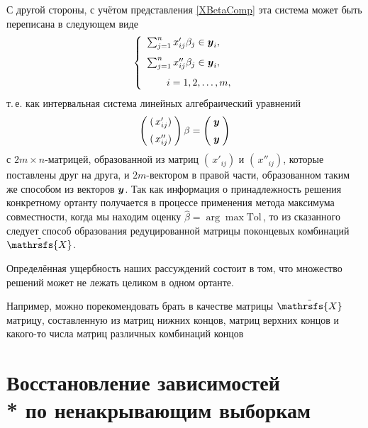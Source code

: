 \documentclass[a5paper,openany]{book}
\newcommand{\mbf}[1]{\protect\text{\boldmath$#1$}}
\newcommand{\Tol}{\mathrm{Tol}\,}
\newcommand{\calX}{\mathrsfs{X}}
\begin{document}
С другой стороны, с учётом представления \eqref{XBetaComp} эта система может быть 
переписана в следующем виде 
\begin{equation*} 
\left\{ 
\begin{array}{l}
\sum_{j=1}^n x'_{ij}\beta_{j}  \in\mbf{y}_{i}, \\[3mm] 
\sum_{j=1}^n x''_{ij}\beta_{j} \in\mbf{y}_{i}, \\[3mm] 
\qquad  i = 1,2,\ldots,m, 
\end{array} 
\right. 
\end{equation*} 
т.\,е. как интервальная система линейных алгебраический уравнений 
\begin{equation*} 
\left( 
\begin{array}{@{\;}c@{\;}} 
(\,x'_{ij}) \\[2mm] 
(\,x''_{ij}) 
\end{array}
\right) \beta = 
\left( 
\begin{array}{@{\;}c@{\;}} 
\mbf{y} \\[2mm] \mbf{y} 
\end{array} 
\right)
\end{equation*} 
с $2m\times n$-матрицей, образованной из матриц $(\,x'_{ij})$ и $(\,x''_{ij})$, 
которые поставлены друг на друга, и $2m$-вектором в правой части, образованном 
таким же способом из векторов $\mbf{y}$. Так как информация о принадлежность решения 
конкретному ортанту получается в процессе применения метода максимума совместности, 
когда мы находим оценку $\hat{\beta} = \arg\max \Tol$, то из сказанного следует способ 
образования редуцированной матрицы поконцевых комбинаций $\tilde{\calX}$. 
  
Определённая ущербность наших рассуждений состоит в том, что множество решений может 
не лежать целиком в одном ортанте. 
    
Например, можно порекомендовать брать в качестве матрицы $\tilde{\calX}$ 
матрицу, составленную из матриц нижних концов, матриц верхних концов и какого-то 
числа матриц различных комбинаций концов 
  
  
  
\section{Восстановление зависимостей \\* по ненакрывающим выборкам} 
\label{NCovSampleProcSect} 
  
\end{document}
